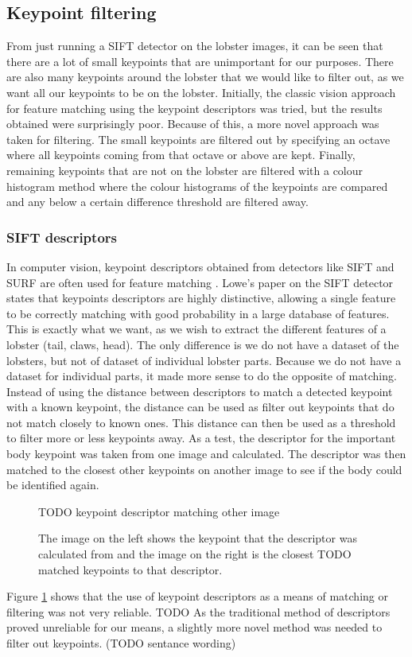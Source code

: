 \subsection{Keypoint filtering}\label{sec:kp-filter}
From just running a SIFT detector on the lobster images, it can be seen that there are a lot of small keypoints that are unimportant for our purposes. There are also many keypoints around the lobster that we would like to filter out, as we want all our keypoints to be on the lobster. Initially, the classic vision approach for feature matching using the keypoint descriptors \cite{sift} was tried, but the results obtained were surprisingly poor. Because of this, a more novel approach was taken for filtering. The small keypoints are filtered out by specifying an octave where all keypoints coming from that octave or above are kept. Finally, remaining keypoints that are not on the lobster are filtered with a colour histogram method where the colour histograms of the keypoints are compared and any below a certain difference threshold are filtered away.

\subsubsection{SIFT descriptors}
In computer vision, keypoint descriptors obtained from detectors like SIFT and SURF are often used for feature matching \cite{cv-matching}. Lowe's paper \cite{sift} on the SIFT detector states that keypoints descriptors are highly distinctive, allowing a single feature to be correctly matching with good probability in a large database of features. This is exactly what we want, as we wish to extract the different features of a lobster (tail, claws, head). The only difference is we do not have a dataset of the lobsters, but not of dataset of individual lobster parts. 
\n
Because we do not have a dataset for individual parts, it made more sense to do the opposite of matching. Instead of using the distance between descriptors to match a detected keypoint with a known keypoint, the distance can be used as filter out keypoints that do not match closely to known ones. This distance can then be used as a threshold to filter more or less keypoints away. 
\n
As a test, the descriptor for the important body keypoint was taken from one image and calculated. The descriptor was then matched to the closest other keypoints on another image to see if the body could be identified again. 

\begin{figure}[H]
\centering
TODO keypoint descriptor matching other image
\caption{The image on the left shows the keypoint that the descriptor was calculated from and the image on the right is the closest TODO matched keypoints to that descriptor.}
\label{fig:kp-descriptor}
\end{figure}
\noindent
Figure \ref{fig:kp-descriptor} shows that the use of keypoint descriptors as a means of matching or filtering was not very reliable. TODO
\n
As the traditional method of descriptors proved unreliable for our means, a slightly more novel method was needed to filter out keypoints. (TODO sentance wording)

